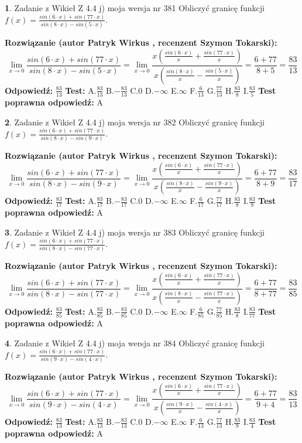 \documentclass[12pt, a4paper]{article}
\theoremstyle{definition} %
\newtheorem{zad}{}
\newcommand{\zadStart}[1]{\begin{zad}#1\newline}
\newcommand{\zadStop}{\end{zad}}
\newcommand{\rozwStart}[2]{\noindent \textbf{Rozwiązanie (autor #1 , recenzent #2): }\newline}
\newcommand{\rozwStop}{\newline}
\newcommand{\odpStart}{\noindent \textbf{Odpowiedź:}\newline}
\newcommand{\odpStop}{\newline}
\newcommand{\testStart}{\noindent \textbf{Test:}\newline}
\newcommand{\testStop}{\newline}
\newcommand{\kluczStart}{\noindent \textbf{Test poprawna odpowiedź:}\newline}
\newcommand{\kluczStop}{\newline}
\begin{document}
\zadStart{Zadanie z Wikieł Z 4.4 j) moja wersja nr 381}
Obliczyć granicę funkcji $f(x)=\frac{sin(6\cdot x) +sin(77\cdot x)}{sin(8\cdot x) -sin(5\cdot x)}$.
\zadStop
\rozwStart{Patryk Wirkus}{Szymon Tokarski}
$$\lim\limits_{x\to 0}\frac{sin(6\cdot x) +sin(77\cdot x)}{sin(8\cdot x) -sin(5\cdot x)}=\lim\limits_{x\to 0}\frac{x(\frac{sin(6\cdot x)}{x}+\frac{sin(77\cdot x)}{x})}{x(\frac{sin(8\cdot x)}{x}-\frac{sin(5\cdot x)}{x})}=\frac{6+77}{8+5} = \frac{83}{13}$$
\rozwStop
\odpStart
$\frac{83}{13}$
\odpStop
\testStart
A.$\frac{83}{13}$
B.$-\frac{83}{13}$
C.$0$
D.$-\infty$
E.$\infty$
F.$\frac{6}{13}$
G.$\frac{77}{13}$
H.$\frac{83}{8}$
I.$\frac{83}{5}$
\testStop
\kluczStart
A
\kluczStop



\zadStart{Zadanie z Wikieł Z 4.4 j) moja wersja nr 382}
Obliczyć granicę funkcji $f(x)=\frac{sin(6\cdot x) +sin(77\cdot x)}{sin(8\cdot x) -sin(9\cdot x)}$.
\zadStop
\rozwStart{Patryk Wirkus}{Szymon Tokarski}
$$\lim\limits_{x\to 0}\frac{sin(6\cdot x) +sin(77\cdot x)}{sin(8\cdot x) -sin(9\cdot x)}=\lim\limits_{x\to 0}\frac{x(\frac{sin(6\cdot x)}{x}+\frac{sin(77\cdot x)}{x})}{x(\frac{sin(8\cdot x)}{x}-\frac{sin(9\cdot x)}{x})}=\frac{6+77}{8+9} = \frac{83}{17}$$
\rozwStop
\odpStart
$\frac{83}{17}$
\odpStop
\testStart
A.$\frac{83}{17}$
B.$-\frac{83}{17}$
C.$0$
D.$-\infty$
E.$\infty$
F.$\frac{6}{17}$
G.$\frac{77}{17}$
H.$\frac{83}{8}$
I.$\frac{83}{9}$
\testStop
\kluczStart
A
\kluczStop



\zadStart{Zadanie z Wikieł Z 4.4 j) moja wersja nr 383}
Obliczyć granicę funkcji $f(x)=\frac{sin(6\cdot x) +sin(77\cdot x)}{sin(8\cdot x) -sin(77\cdot x)}$.
\zadStop
\rozwStart{Patryk Wirkus}{Szymon Tokarski}
$$\lim\limits_{x\to 0}\frac{sin(6\cdot x) +sin(77\cdot x)}{sin(8\cdot x) -sin(77\cdot x)}=\lim\limits_{x\to 0}\frac{x(\frac{sin(6\cdot x)}{x}+\frac{sin(77\cdot x)}{x})}{x(\frac{sin(8\cdot x)}{x}-\frac{sin(77\cdot x)}{x})}=\frac{6+77}{8+77} = \frac{83}{85}$$
\rozwStop
\odpStart
$\frac{83}{85}$
\odpStop
\testStart
A.$\frac{83}{85}$
B.$-\frac{83}{85}$
C.$0$
D.$-\infty$
E.$\infty$
F.$\frac{6}{85}$
G.$\frac{77}{85}$
H.$\frac{83}{8}$
I.$\frac{83}{77}$
\testStop
\kluczStart
A
\kluczStop



\zadStart{Zadanie z Wikieł Z 4.4 j) moja wersja nr 384}
Obliczyć granicę funkcji $f(x)=\frac{sin(6\cdot x) +sin(77\cdot x)}{sin(9\cdot x) -sin(4\cdot x)}$.
\zadStop
\rozwStart{Patryk Wirkus}{Szymon Tokarski}
$$\lim\limits_{x\to 0}\frac{sin(6\cdot x) +sin(77\cdot x)}{sin(9\cdot x) -sin(4\cdot x)}=\lim\limits_{x\to 0}\frac{x(\frac{sin(6\cdot x)}{x}+\frac{sin(77\cdot x)}{x})}{x(\frac{sin(9\cdot x)}{x}-\frac{sin(4\cdot x)}{x})}=\frac{6+77}{9+4} = \frac{83}{13}$$
\rozwStop
\odpStart
$\frac{83}{13}$
\odpStop
\testStart
A.$\frac{83}{13}$
B.$-\frac{83}{13}$
C.$0$
D.$-\infty$
E.$\infty$
F.$\frac{6}{13}$
G.$\frac{77}{13}$
H.$\frac{83}{9}$
I.$\frac{83}{4}$
\testStop
\kluczStart
A
\kluczStop
\end{document}
